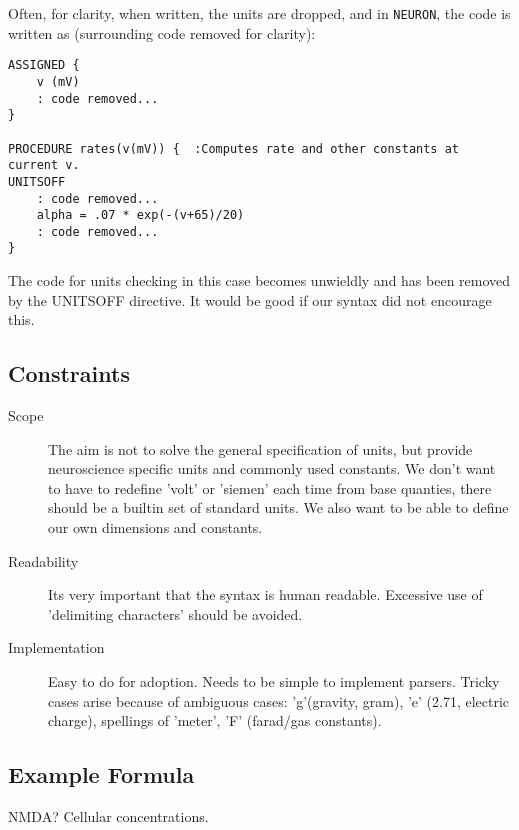\documentclass{article}
\begin{document}
\begin{description}
Often, for clarity, when written, the units are dropped, and in \verb|NEURON|, the code is written as (surrounding code removed for clarity):

\begin{lstlisting}
ASSIGNED {
    v (mV)
    : code removed...
}

PROCEDURE rates(v(mV)) {  :Computes rate and other constants at current v.
UNITSOFF
    : code removed...
    alpha = .07 * exp(-(v+65)/20)
    : code removed...
}
\end{lstlisting}
The code for units checking in this case becomes unwieldly and has been removed by the UNITSOFF directive. It would be good if our syntax did not encourage this.







\end{description}



\subsection{Constraints}
\begin{description}
\item[Scope] The aim is not to solve the general specification of units, but provide neuroscience specific units and commonly used constants. We don't want to have to redefine 'volt' or 'siemen' each time from base quanties, there should be a builtin set of standard units. We also want to be able to define our own dimensions and constants.
\item[Readability] Its very important that the syntax is human readable. Excessive use of 'delimiting characters' should be avoided.
\item[Implementation] Easy to do for adoption. Needs to be simple to implement parsers. Tricky cases arise because of ambiguous cases: 'g'(gravity, gram), 'e' (2.71, electric charge), spellings of 'meter', 'F' (farad/gas constants).
\end{description}

\subsection{Example Formula}
\begin{description}
\item NMDA? Cellular concentrations.
\end{description}
\end{document}

